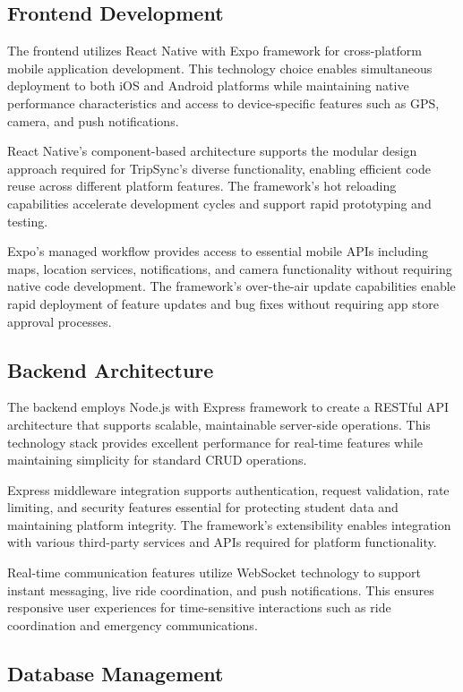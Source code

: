 \documentclass[conference]{IEEEtran}
\begin{document}
\subsection{Frontend Development}

The frontend utilizes React Native with Expo framework for cross-platform mobile application development. This technology choice enables simultaneous deployment to both iOS and Android platforms while maintaining native performance characteristics and access to device-specific features such as GPS, camera, and push notifications.

React Native's component-based architecture supports the modular design approach required for TripSync's diverse functionality, enabling efficient code reuse across different platform features. The framework's hot reloading capabilities accelerate development cycles and support rapid prototyping and testing.

Expo's managed workflow provides access to essential mobile APIs including maps, location services, notifications, and camera functionality without requiring native code development. The framework's over-the-air update capabilities enable rapid deployment of feature updates and bug fixes without requiring app store approval processes.

\subsection{Backend Architecture}

The backend employs Node.js with Express framework to create a RESTful API architecture that supports scalable, maintainable server-side operations. This technology stack provides excellent performance for real-time features while maintaining simplicity for standard CRUD operations.

Express middleware integration supports authentication, request validation, rate limiting, and security features essential for protecting student data and maintaining platform integrity. The framework's extensibility enables integration with various third-party services and APIs required for platform functionality.

Real-time communication features utilize WebSocket technology to support instant messaging, live ride coordination, and push notifications. This ensures responsive user experiences for time-sensitive interactions such as ride coordination and emergency communications.

\subsection{Database Management}
\end{document}
